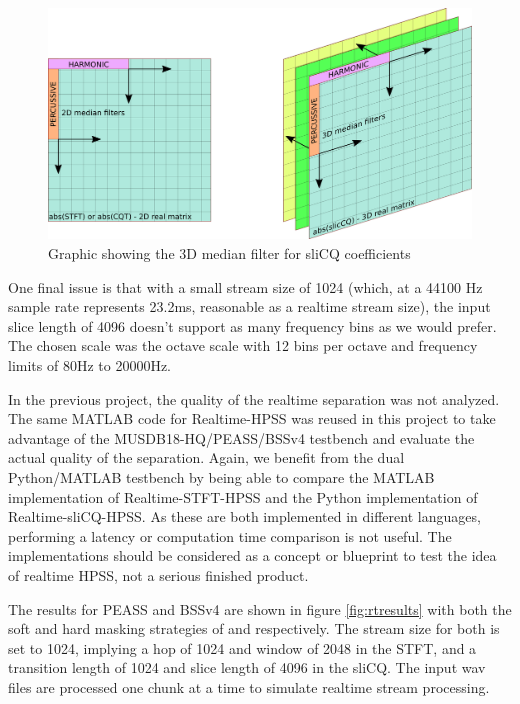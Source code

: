 \documentclass[letter,12pt]{article}
\begin{document}
\begin{figure}[ht]
	\centering
	\includegraphics[width=14cm]{./3dmfilt.png}
	\caption{Graphic showing the 3D median filter for sliCQ coefficients}
	\label{fig:3dmfilt}
\end{figure}

One final issue is that with a small stream size of 1024 (which, at a 44100 Hz sample rate represents 23.2ms, reasonable as a realtime stream size), the input slice length of 4096 doesn't support as many frequency bins as we would prefer. The chosen scale was the octave scale with 12 bins per octave and frequency limits of 80Hz to 20000Hz.

In the previous project, the quality of the realtime separation was not analyzed. The same MATLAB code for Realtime-HPSS was reused in this project to take advantage of the MUSDB18-HQ/PEASS/BSSv4 testbench and evaluate the actual quality of the separation. Again, we benefit from the dual Python/MATLAB testbench by being able to compare the MATLAB implementation of Realtime-STFT-HPSS and the Python implementation of Realtime-sliCQ-HPSS. As these are both implemented in different languages, performing a latency or computation time comparison is not useful. The implementations should be considered as a concept or blueprint to test the idea of realtime HPSS, not a serious finished product.

The results for PEASS and BSSv4 are shown in figure \ref{fig:rtresults} with both the soft and hard masking strategies of \citet{fitzgerald1} and \citet{driedger} respectively. The stream size for both is set to 1024, implying a hop of 1024 and window of 2048 in the STFT, and a transition length of 1024 and slice length of 4096 in the sliCQ. The input wav files are processed one chunk at a time to simulate realtime stream processing.
\end{document}
